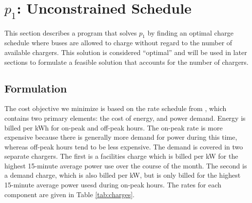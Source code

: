 \section{$p_1$: Unconstrained Schedule \label{sec:unconstrainedSchedule}}
This section describes a program that solves $p_1$ by finding an optimal charge schedule where buses are allowed to charge without regard to the number of available chargers. This solution is considered ``optimal'' and will be used in later sections to formulate a feasible solution that accounts for the number of chargers.
 

 
\subsection{Formulation \label{sec:formulation}} 
The cost objective we minimize is based on the rate schedule from \cite{rocky_mountain_power_rocky_2021}, which contains two primary elements: the cost of energy, and power demand. Energy is billed per kWh for on-peak and off-peak hours. The on-peak rate is more expensive because there is generally more demand for power during this time, whereas off-peak hours tend to be less expensive. The demand is covered in two separate chargers.  The first is a facilities charge which is billed per kW for the highest 15-minute average power use over the course of the month. The second is a demand charge, which is also billed per kW, but is only billed for the highest 15-minute average power usesd during on-peak hours. The rates for each component are given in Table \ref{tab:charges}.  

